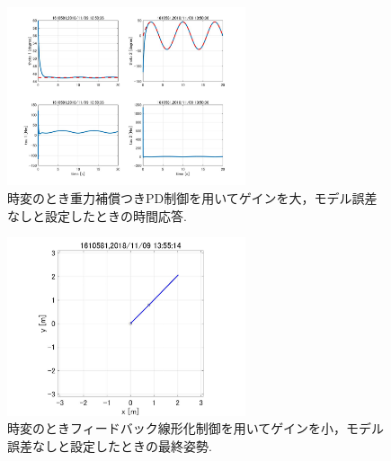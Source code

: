 \documentclass[twocolumn, 10pt,a4j]{jsarticle}
\begin{document}
    \begin{figure}[H]
      \begin{center}
        \includegraphics[width=7cm]{../img/img/kansetu_juryoku_hosyo_PD_zihen_large_no_model_gosa_zikan_auto.jpg}
        \caption{時変のとき重力補償つきPD制御を用いてゲインを大，モデル誤差なしと設定したときの時間応答.}
      \end{center}
    \end{figure}
    \begin{figure}[H]
      \begin{center}
        \includegraphics[width=7cm]{../img/img/kansetu_FB_zihen_small_no_model_gosa_saisyu_sisei.jpg}
        \caption{時変のときフィードバック線形化制御を用いてゲインを小，モデル誤差なしと設定したときの最終姿勢.}
      \end{center}
    \end{figure}
\end{document}
